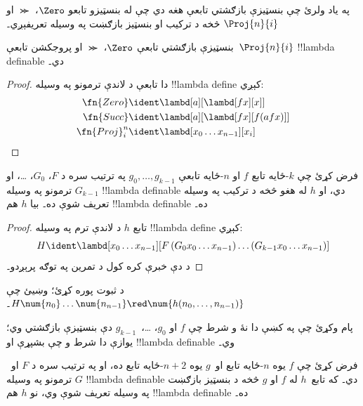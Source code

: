 \documentclass[../../../include/open-logic-section]{subfiles}
\begin{document}

په ياد ولرئ چې بنسټيزې بازګشتي تابعې هغه دي چې له
بنسټيزو تابعو $\Zero$، $\Succ$ او $\Proj{n}{i}$ څخه د
ترکيب او بنسټيز بازګښت په وسيله تعريفېږي۔

\begin{lem}
  بنسټيزې بازګشتي تابعې $\Zero$، $\Succ$ او
  پروجکشن تابعې~$\Proj{n}{i}$ !!{lambda definable} دي۔
\end{lem}

\begin{proof}
دا تابعې د لاندې ترمونو په وسيله !!{lambda define} کېږي:
\begin{align*}
  \fn{Zero} & \ident \lambd[a][\lambd[fx][x]]\\
  \fn{Succ} & \ident \lambd[a][\lambd[fx][f (a f x)]] \\
  \fn{Proj}^n_i & \ident \lambd[x_0\dots x_{n-1}][x_i]
\end{align*}
\end{proof}

\begin{lem}
   فرض کړئ چې $k$-ځايه تابع $f$ او
  $n$-ځايه تابعې $g_0, \dots, g_{k-1}$ په ترتيب سره د
  $F$، $G_0$، \dots، او $G_{k-1}$ ترمونو په وسيله
  !!{lambda definable} دي، او $h$ له هغو څخه د ترکيب
  په وسيله تعريف شوې ده۔ بيا $h$ هم !!{lambda definable} ده۔
\end{lem}

\begin{proof}
  تابع $h$ د لاندې ترم په وسيله !!{lambda define} کېږي:
  \[
  H \ident \lambd[x_0 \dots x_{n-1}][F\, (G_0 x_0 \dots
    x_{n-1}) \dots (G_{k-1} x_0 \dots x_{n-1})]
  \]
  د دې خبرې کره کول د تمرين په توګه پرېږدو۔
\end{proof}

\begin{prob}
  د  ثبوت پوره کړئ؛
  وښيئ چې $H\num{n_0}\dots\num{n_{n-1}} \red \num{h(n_0, \dots,
    n_{n-1})}$۔
\end{prob}

پام وکړئ چې په  کښې دا نۀ و شرط چې
$f$ او $g_0$، \dots،~$g_{k-1}$ دې بنسټيزې بازګشتي
وي؛ يوازې دا شرط و چې بشپړې او !!{lambda definable} وي۔

\begin{lem}
  فرض کړئ چې $f$ يوه $n$-ځايه تابع او~$g$ يوه
  $n+2$-ځايه تابع ده، او په ترتيب سره د $F$ او~$G$
  ترمونو په وسيله !!{lambda definable} دي۔ که تابع~$h$
  له $f$ او $g$ څخه د بنسټيز بازګښت په وسيله تعريف شوې
  وي، نو $h$ هم !!{lambda definable} ده۔
\end{lem}
\end{document}
